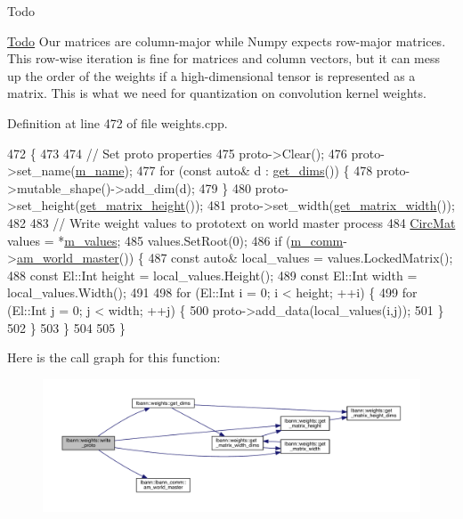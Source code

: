 \begin{DoxyRefDesc}{Todo}
\item[\hyperlink{todo__todo000014}{Todo}]Our matrices are column-\/major while Numpy expects row-\/major matrices. This row-\/wise iteration is fine for matrices and column vectors, but it can mess up the order of the weights if a high-\/dimensional tensor is represented as a matrix. This is what we need for quantization on convolution kernel weights. \end{DoxyRefDesc}


Definition at line 472 of file weights.\+cpp.


\begin{DoxyCode}
472                                                             \{
473 
474   \textcolor{comment}{// Set proto properties}
475   proto->Clear();
476   proto->set\_name(\hyperlink{classlbann_1_1weights_a08abf0bb29aa47be21bfc7473b4b9b99}{m\_name});
477   \textcolor{keywordflow}{for} (\textcolor{keyword}{const} \textcolor{keyword}{auto}& d : \hyperlink{classlbann_1_1weights_ac1f4e6725fc8b265e0ed5dfe140a321a}{get\_dims}()) \{
478     proto->mutable\_shape()->add\_dim(d);
479   \}
480   proto->set\_height(\hyperlink{classlbann_1_1weights_ad36676b9b43bced1cc7e332e3745411f}{get\_matrix\_height}());
481   proto->set\_width(\hyperlink{classlbann_1_1weights_abc3cf3a5b992302b1eaaea1fdf3b377d}{get\_matrix\_width}());
482 
483   \textcolor{comment}{// Write weight values to prototext on world master process}
484   \hyperlink{base_8hpp_a48abd140bc807a8ac1381efd1bfeb375}{CircMat} values = *\hyperlink{classlbann_1_1weights_a6b2df671b6d4c4dd595477971eea0543}{m\_values}; 
485   values.SetRoot(0); 
486   \textcolor{keywordflow}{if} (\hyperlink{classlbann_1_1weights_a223e8907034888392548ae901222b39c}{m\_comm}->\hyperlink{classlbann_1_1lbann__comm_a1ef526486183a29feadca9bef096a534}{am\_world\_master}()) \{
487     \textcolor{keyword}{const} \textcolor{keyword}{auto}& local\_values = values.LockedMatrix();
488     \textcolor{keyword}{const} El::Int height = local\_values.Height();
489     \textcolor{keyword}{const} El::Int width = local\_values.Width();
491 
498     \textcolor{keywordflow}{for} (El::Int i = 0; i < height; ++i) \{
499       \textcolor{keywordflow}{for} (El::Int j = 0; j < width; ++j) \{
500         proto->add\_data(local\_values(i,j));
501       \}
502     \}
503   \}
504 
505 \}
\end{DoxyCode}
Here is the call graph for this function\+:\nopagebreak
\begin{figure}[H]
\begin{center}
\leavevmode
\includegraphics[width=350pt]{classlbann_1_1weights_a1a2631987f38d32a90fbee61053a04cc_cgraph}
\end{center}
\end{figure}
